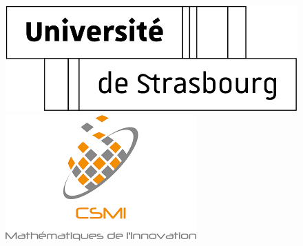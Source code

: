 \documentclass[ 
11pt, %
french, %
singlespacing, %
parskip, %
headsepline, %
openany, %
]{MastersDoctoralThesis} %
\author{Roussel Desmond \textsc{Nzoyem}} %
\theoremstyle{plain}
\numberwithin{theorem}{section}  %
\begin{document}
\frontmatter %

\pagestyle{plain} %


\begin{titlepage}

\begin{figure}[!htb]
   \begin{minipage}{0.24\textwidth}
     \centering
     \vspace*{12pt}
     \includegraphics[width=.99\linewidth]{LogoUnistra2.png}
   \end{minipage}\hspace*{7pt}
   \begin{minipage}{0.24\textwidth}
    \centering
    \includegraphics[width=.99\linewidth]{LogoCSMI.png}
  \end{minipage}\hfill
   \begin{minipage}{0.24\textwidth}
     \centering

\end{minipage}
\end{figure}
\end{titlepage}
\end{document}
